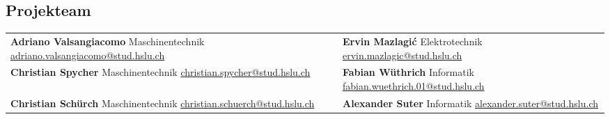\subsection{Projekteam}

\begin{tabularx}{\columnwidth}{XX}
	
	\textbf{Adriano Valsangiacomo} \newline
	Maschinentechnik \newline
	\href{mailto:adriano.valsangiacomo@stud.hslu.ch}{adriano.valsangiacomo@stud.hslu.ch} \newline
	
	&  
	
	\textbf{Ervin Mazlagi\'c} \newline
	Elektrotechnik \newline
	\href{mailto:ervin.mazlagic@stud.hslu.ch}{ervin.mazlagic@stud.hslu.ch} \newline 
	
	\\ 
	
	\textbf{Christian Spycher} \newline
    Maschinentechnik \newline
    \href{mailto:christian.spycher@stud.hslu.ch}{christian.spycher@stud.hslu.ch} \newline 
     
    
    & 
    
    \textbf{Fabian Wüthrich} \newline
    Informatik \newline
    \href{mailto:fabian.wuethrich.01@stud.hslu.ch}{fabian.wuethrich.01@stud.hslu.ch} \newline 
    
    \\ 
	
	\textbf{Christian Schürch} \newline
	Maschinentechnik \newline
	\href{mailto:christian.schuerch@stud.hslu.ch}{christian.schuerch@stud.hslu.ch} \newline 
	
	& 
	 
	\textbf{Alexander Suter} \newline
	Informatik \newline
	\href{mailto:alexander.suter@stud.hslu.ch}{alexander.suter@stud.hslu.ch} \newline 
	
	\\ 
\end{tabularx} 
